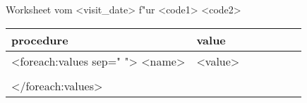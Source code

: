 \documentclass{scrreprt}
\begin{document}
\noindent Worksheet {\it <Voller Titel>} vom <visit_date> f"ur <code1> <code2> \\

\begin{tabular}{lllllll}
procedure &  value&   \tabularnewline
\hline
 <foreach:values sep=" ">
<name> &<value>\\
\tabularnewline
</foreach:values>
\hline
\end{tabular}
\end{document}
